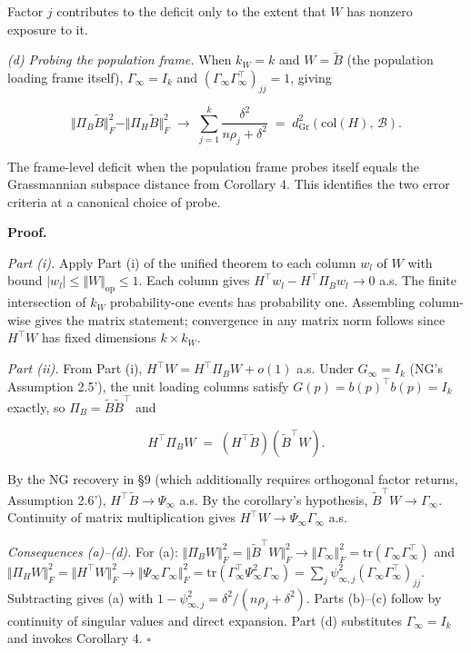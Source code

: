 \documentclass{article}
\theoremstyle{remark}
\begin{document}
Factor $j$ contributes to the deficit only to the extent that $W$ has nonzero exposure to it.

\textit{(d) Probing the population frame.} When $k_W = k$ and $W = \tilde{B}$ (the population loading frame itself), $\Gamma_\infty = I_k$ and $(\Gamma_\infty\Gamma_\infty^\top)_{jj} = 1$, giving

\[
\Vert \Pi_B \tilde{B}\Vert_F^2 - \Vert \Pi_H \tilde{B}\Vert_F^2 \;\longrightarrow\; \sum_{j=1}^k \frac{\delta^2}{n\rho_j + \delta^2} \;=\; d_{\mathrm{Gr}}^2(\mathrm{col}(H),\,\mathcal{B}).
\]

The frame-level deficit when the population frame probes itself equals the Grassmannian subspace distance from Corollary 4. This identifies the two error criteria at a canonical choice of probe.

\textbf{Proof.}

\textit{Part (i).} Apply Part (i) of the unified theorem to each column $w_l$ of $W$ with bound $|w_l| \le \Vert W\Vert_{\mathrm{op}} \le 1$. Each column gives $H^\top w_l - H^\top\Pi_B w_l \to 0$ a.s. The finite intersection of $k_W$ probability-one events has probability one. Assembling column-wise gives the matrix statement; convergence in any matrix norm follows since $H^\top W$ has fixed dimensions $k \times k_W$.

\textit{Part (ii).} From Part (i), $H^\top W = H^\top\Pi_B W + o(1)$ a.s. Under $G_\infty = I_k$ (NG's Assumption 2.5'), the unit loading columns satisfy $G(p) = b(p)^\top b(p) = I_k$ exactly, so $\Pi_B = \tilde{B}\tilde{B}^\top$ and

\[
H^\top\Pi_B W \;=\; (H^\top\tilde{B})(\tilde{B}^\top W).
\]

By the NG recovery in §9 (which additionally requires orthogonal factor returns, Assumption 2.6'), $H^\top\tilde{B} \to \Psi_\infty$ a.s. By the corollary's hypothesis, $\tilde{B}^\top W \to \Gamma_\infty$. Continuity of matrix multiplication gives $H^\top W \to \Psi_\infty\Gamma_\infty$ a.s.

\textit{Consequences (a)–(d).} For (a): $\Vert \Pi_B W\Vert_F^2 = \Vert \tilde{B}^\top W\Vert_F^2 \to \Vert \Gamma_\infty\Vert_F^2 = \mathrm{tr}(\Gamma_\infty\Gamma_\infty^\top)$ and $\Vert \Pi_H W\Vert_F^2 = \Vert H^\top W\Vert_F^2 \to \Vert \Psi_\infty\Gamma_\infty\Vert_F^2 = \mathrm{tr}(\Gamma_\infty^\top\Psi_\infty^2\Gamma_\infty) = \sum_j\psi_{\infty,j}^2(\Gamma_\infty\Gamma_\infty^\top)_{jj}$. Subtracting gives (a) with $1 - \psi_{\infty,j}^2 = \delta^2/(n\rho_j+\delta^2)$. Parts (b)–(c) follow by continuity of singular values and direct expansion. Part (d) substitutes $\Gamma_\infty = I_k$ and invokes Corollary 4. $\square$
\end{document}
